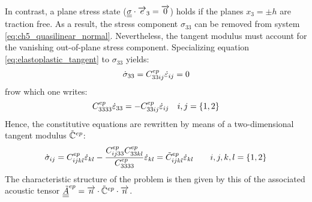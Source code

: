 In contrast, a plane stress state (${\underline{\underline{\sigma}}}\cdot{\overrightarrow{e}}_3={\overrightarrow{0}}$) holds if the planes $x_3=\pm h$ are traction free.
As a result, the stress component $\sigma_{33}$ can be removed from system \eqref{eq:ch5_quasilinear_normal}.
Nevertheless, the tangent modulus must account for the vanishing out-of-plane stress component.
Specializing equation \eqref{eq:elastoplastic_tangent} to $\sigma_{33}$ yields:
\begin{equation*}
  \dot{\sigma}_{33}=C^{ep}_{33ij} \dot{\varepsilon}_{ij} =0
\end{equation*}
frow which one writes:
\begin{equation*}
  C^{ep}_{3333} \dot{\varepsilon}_{33} = - C^{ep}_{33ij}\dot{\varepsilon}_{ij} \quad i,j=\{1,2\}
\end{equation*}
Hence, the constitutive equations are rewritten by means of a two-dimensional tangent modulus $\tilde{\mathbb{C}}^{ep}$:
\begin{equation}
  \label{eq:CP_constitutive}
  \dot{\sigma}_{ij}=C^{ep}_{ijkl} \dot{\varepsilon}_{kl} - \frac{C^{ep}_{ij33}C^{ep}_{33kl}}{C^{ep}_{3333}}\dot{\varepsilon}_{kl}= \tilde{C}^{ep}_{ijkl} \dot{\varepsilon}_{kl}\qquad i,j,k,l=\{1,2\} 
\end{equation}
The characteristic structure of the problem is then given by this of the associated acoustic tensor ${\underline{\underline{\tilde{A}}}}^{ep}={\overrightarrow{n}}\cdot\tilde{\mathbb{C}}^{ep}\cdot {\overrightarrow{n}}$.

